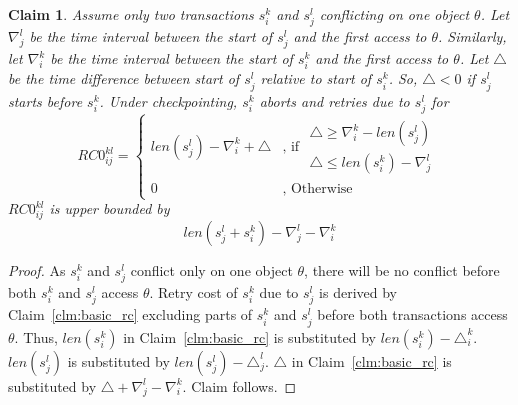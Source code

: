 \documentclass[preprint]{sigplanconf}
\newtheorem{clm}{Claim}
\begin{document}
\begin{clm}\label{clm:2_tx_cp_retry_cost}
Assume only two transactions $s_i^k$ and $s_j^l$ conflicting on one object $\theta$. Let $\nabla_{j}^{l}$ be the time interval between the start of $s_{j}^{l}$ and the first access to $\theta$. Similarly, let $\nabla_{i}^{k}$ be the time interval between the start of $s_i^k$ and the first access to $\theta$. Let $\triangle$ be the time difference between start of $s_j^l$ relative to start of $s_i^k$. So, $\triangle < 0$ if $s_j^l$ starts before $s_i^k$. Under checkpointing, $s_{i}^{k}$ aborts and retries due to $s_{j}^{l}$
for 
\begin{equation}
RC0_{ij}^{kl}=\begin{cases}
len\left(s_{j}^{l}\right)-\nabla_{i}^{k}+\triangle & \mbox{, if }\begin{gathered}\triangle\ge\nabla_{i}^{k}-len\left(s_{j}^{l}\right)\\
\triangle\le len\left(s_{i}^{k}\right)-\nabla_{j}^{l}
\end{gathered}
\\
0 & \mbox{, Otherwise}
\end{cases}\label{eq:2_tx_cp_retry_cost}
\end{equation}
%
$RC0_{ij}^{kl}$ is upper bounded by 
\begin{equation}
len\left(s_{j}^{l}+s_{i}^{k}\right)-\nabla_{j}^{l}-\nabla_{i}^{k}\label{eq:rc0_upper_bound}
\end{equation}

\end{clm}
%
\begin{proof}
%
As $s_i^k$ and $s_j^l$ conflict only on one object $\theta$, there will be no conflict before both $s_i^k$ and $s_j^l$ access $\theta$. Retry cost of $s_i^k$ due to $s_j^l$ is derived by Claim~\ref{clm:basic_rc} excluding parts of $s_i^k$ and $s_j^l$ before both transactions access $\theta$. Thus, $len\left(s_i^k\right)$ in Claim~\ref{clm:basic_rc} is substituted by $len\left(s_i^k\right)-\triangle_i^k$. $len\left(s_j^l\right)$ is substituted by $len\left(s_j^l\right)-\triangle_j^l$. $\triangle$ in Claim~\ref{clm:basic_rc} is substituted by $\triangle+\nabla_j^l-\nabla_i^k$. Claim follows.
%
\end{proof}
%
\end{document}
